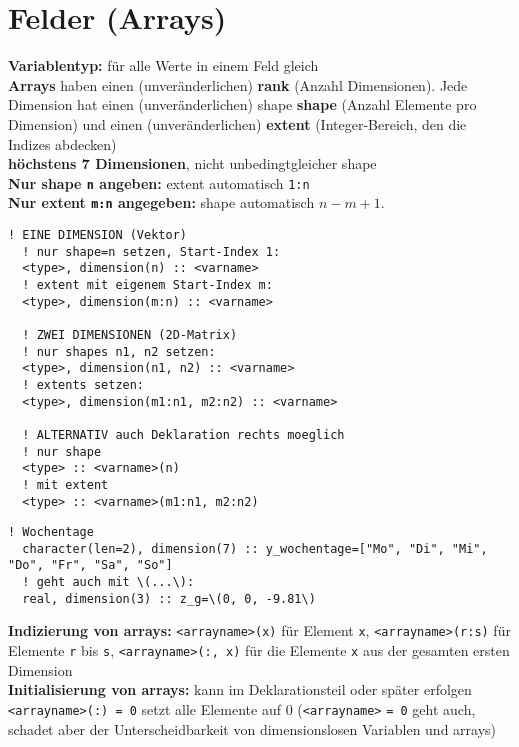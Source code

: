 \documentclass[a4paper, twocolumn]{scrarticle}
\begin{document}
\section{Felder (Arrays)}
\textbf{Variablentyp:} für alle Werte in einem Feld  gleich\\
\textbf{Arrays} haben einen (unveränderlichen) \textbf{rank} (Anzahl Dimensionen). Jede Dimension hat einen (unveränderlichen) shape \textbf{shape} (Anzahl Elemente pro Dimension) und einen (unveränderlichen) \textbf{extent} (Integer-Bereich, den die Indizes abdecken)\\
\textbf{höchstens 7 Dimensionen}, nicht unbedingtgleicher shape\\
\textbf{Nur shape \lstinline|n| angeben:} extent automatisch \lstinline|1:n|\\
\textbf{Nur extent \lstinline|m:n| angegeben:} shape automatisch $n-m+1$.
\begin{lstlisting}[caption={\bfseries Deklarationsmöglichkeiten für arrays}]
  ! EINE DIMENSION (Vektor)
  ! nur shape=n setzen, Start-Index 1:
  <type>, dimension(n) :: <varname>
  ! extent mit eigenem Start-Index m:
  <type>, dimension(m:n) :: <varname>
  
  ! ZWEI DIMENSIONEN (2D-Matrix)
  ! nur shapes n1, n2 setzen:
  <type>, dimension(n1, n2) :: <varname>
  ! extents setzen:
  <type>, dimension(m1:n1, m2:n2) :: <varname>
  
  ! ALTERNATIV auch Deklaration rechts moeglich
  ! nur shape
  <type> :: <varname>(n)
  ! mit extent
  <type> :: <varname>(m1:n1, m2:n2)
\end{lstlisting}
\begin{lstlisting}[caption={\bfseries Beispiele direkte Definition arrays}]
  ! Wochentage
  character(len=2), dimension(7) :: y_wochentage=["Mo", "Di", "Mi", "Do", "Fr", "Sa", "So"]
  ! geht auch mit \(...\):
  real, dimension(3) :: z_g=\(0, 0, -9.81\)
\end{lstlisting}
\textbf{Indizierung von arrays:} \lstinline|<arrayname>(x)| für Element \lstinline|x|, \lstinline|<arrayname>(r:s)| für Elemente \lstinline|r| bis \lstinline|s|, \lstinline|<arrayname>(:, x)| für die Elemente \lstinline|x| aus der gesamten ersten Dimension\\
\textbf{Initialisierung von arrays:} kann im Deklarationsteil oder später erfolgen \lstinline|<arrayname>(:) = 0| setzt alle Elemente auf 0 (\lstinline|<arrayname>| \lstinline|= 0| geht auch, schadet aber der Unterscheidbarkeit von dimensionslosen Variablen und arrays)\\
\end{document}
